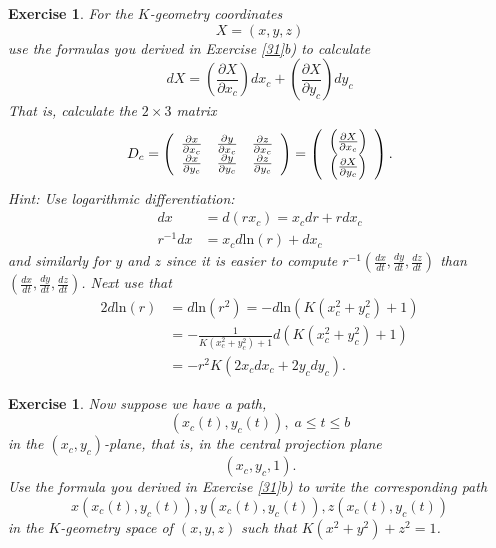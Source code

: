 \documentclass{article}%
\newtheorem{exercise}[theorem]{Exercise}
\begin{document}
\begin{exercise}
\label{33}For the $K$-geometry coordinates%
\[
X=\left(  x,y,z\right)
\]
use the formulas you derived in Exercise \ref{31}b) to calculate%
\[
dX=\left(  \frac{\partial X}{\partial x_{c}}\right)  dx_{c}+\left(
\frac{\partial X}{\partial y_{c}}\right)  dy_{c}%
\]
That is, calculate the $2\times3$ matrix%
\[
D_{c}=\left(
\begin{array}
[c]{ccc}%
\frac{\partial x}{\partial x_{c}} & \frac{\partial y}{\partial x_{c}} &
\frac{\partial z}{\partial x_{c}}\\
\frac{\partial x}{\partial y_{c}} & \frac{\partial y}{\partial y_{c}} &
\frac{\partial z}{\partial y_{c}}%
\end{array}
\right)  =\left(
\begin{array}
[c]{c}%
\left(  \frac{\partial X}{\partial x_{c}}\right) \\
\left(  \frac{\partial X}{\partial y_{c}}\right)
\end{array}
\right)  .
\]
Hint: Use logarithmic differentiation:%
\begin{align*}
dx  &  =d\left(  rx_{c}\right)  =x_{c}dr+rdx_{c}\\
r^{-1}dx  &  =x_{c}d\mathrm{ln}\left(  r\right)  +dx_{c}%
\end{align*}
and similarly for $y$ and $z$ since it is easier to compute $r^{-1}\left(
\frac{dx}{dt},\frac{dy}{dt},\frac{dz}{dt}\right)  $ than $\left(  \frac
{dx}{dt},\frac{dy}{dt},\frac{dz}{dt}\right)  $. Next use that%
\begin{align*}
2d\mathrm{ln}\left(  r\right)   &  =d\mathrm{ln}\left(  r^{2}\right)
=-d\mathrm{ln}\left(  K\left(  x_{c}^{2}+y_{c}^{2}\right)  +1\right) \\
&  =-\frac{1}{K\left(  x_{c}^{2}+y_{c}^{2}\right)  +1}d\left(  K\left(
x_{c}^{2}+y_{c}^{2}\right)  +1\right) \\
&  =-r^{2}K\left(  2x_{c}dx_{c}+2y_{c}dy_{c}\right)  .
\end{align*}

\end{exercise}

\begin{exercise}
\label{prev}Now suppose we have a path,%
\[
\left(  x_{c}\left(  t\right)  ,y_{c}\left(  t\right)  \right)  ,\;a\leq t\leq
b
\]
in the $\left(  x_{c},y_{c}\right)  $-plane, that is, in the central
projection plane%
\[
\left(  x_{c},y_{c},1\right)  .
\]
Use the formula you derived in Exercise \ref{31}b) to write the corresponding
path%
\[
x\left(  x_{c}\left(  t\right)  ,y_{c}\left(  t\right)  \right)  ,y\left(
x_{c}\left(  t\right)  ,y_{c}\left(  t\right)  \right)  ,z\left(  x_{c}\left(
t\right)  ,y_{c}\left(  t\right)  \right)
\]
in the $K$-geometry space of $\left(  x,y,z\right)  $ such that $K\left(
x^{2}+y^{2}\right)  +z^{2}=1$.
\end{exercise}
\end{document}
